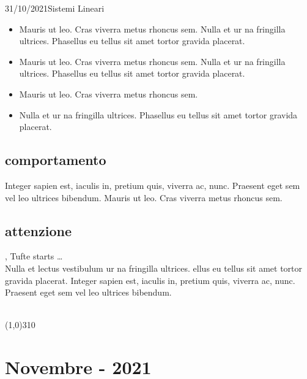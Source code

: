 \documentclass[10pt, twoside, notitlepage, notoc, justified]{tufte-handout}
\begin{document}
\begin{loggentry}{31/10/2021}{Sistemi Lineari}
\begin{itemize}
	\item Mauris ut leo. Cras viverra metus rhoncus sem. Nulla et  ur na fringilla ultrices. Phasellus eu tellus sit amet tortor gravida placerat. 
	\item Mauris ut leo. Cras viverra metus rhoncus sem. Nulla et  ur na fringilla ultrices. Phasellus eu tellus sit amet tortor gravida placerat. 
	\item Mauris ut leo. Cras viverra metus rhoncus sem.
	\item Nulla et  ur na fringilla ultrices. Phasellus eu tellus sit amet tortor gravida placerat. 
\end{itemize}

\subsection{comportamento}
Integer sapien est, iaculis in, pretium quis, viverra ac, nunc. Praesent eget sem vel leo ultrices bibendum. Mauris ut leo. Cras viverra metus rhoncus sem. 

\subsection{attenzione}
, Tufte starts \dots\\Nulla et lectus vestibulum ur na fringilla ultrices. ellus eu tellus sit amet tortor gravida placerat. Integer sapien est, iaculis in, pretium quis, viverra ac, nunc. Praesent eget sem vel leo ultrices bibendum.
\end{loggentry}
\vspace{6pt}\\
\line(1,0){310}\\
\section{Novembre - 2021}
\end{document}
